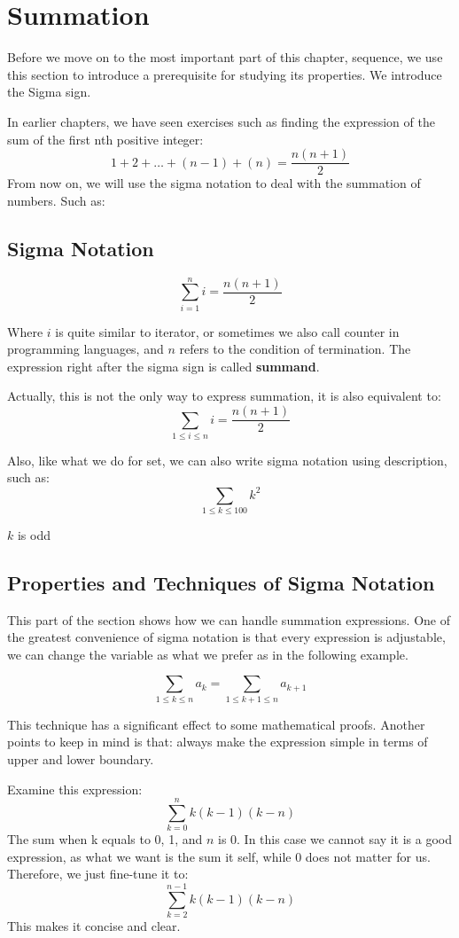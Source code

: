 \documentclass[
	12pt, %
	fleqn, %
	a4paper, %
]{LegrandOrangeBook}
\begin{document}
\section{Summation}
Before we move on to the most important part of this chapter, sequence, we use this section to introduce a prerequisite for studying its properties. We introduce the Sigma sign.

In earlier chapters, we have seen exercises such as finding the expression of the sum of the first nth positive integer:
$$1 + 2 + \dots + (n-1) + (n)= \frac{n(n+1)}{2}$$ 
From now on, we will use the sigma notation to deal with the summation of numbers. Such as:
\subsection{Sigma Notation}
\begin{notation}
    \[
\sum_{i=1}^{n} i = \frac{n(n + 1)}{2}
    \]
\end{notation}
Where $i$ is quite similar to iterator, or sometimes we also call counter in programming languages, and $n$ refers to the condition of termination. The expression right after the sigma sign is called \textbf{summand}.

Actually, this is not the only way to express summation, it is also equivalent to:
\[\sum_{1\leq i\leq n} i = \frac{n(n+1)}{2}\]

Also, like what we do for set, we can also write sigma notation using description, such as: 
\[
\sum_{1 \leq k \leq 100} k^2
\]

\( k \) is odd

\subsection{Properties and Techniques of Sigma Notation}
This part of the section shows how we can handle summation expressions.
One of the greatest convenience of sigma notation is that every expression is adjustable, we can change the variable as what we prefer as in the following example.
\begin{example} \label{exp:siginvariance}
 \[
\sum_{1 \leq k \leq n} a_k = \sum_{1 \leq k+1 \leq n} a_{k+1}
\]
\end{example}
This technique has a significant effect to some mathematical proofs.
Another points to keep in mind is that: always make the expression simple in terms of upper and lower boundary.
\begin{example}
    Examine this expression: 
    \[\sum_{k=0}^{n} k(k-1)(k-n)\]
    The sum when k equals to 0, 1, and $n$ is 0. In this case we cannot say it is a good expression, as what we want is the sum it self, while 0 does not matter for us. Therefore, we just fine-tune it to:
    \[\sum_{k=2}^{n-1} k(k-1)(k-n)\]
    This makes it concise and clear.
\end{example}
\end{document}
